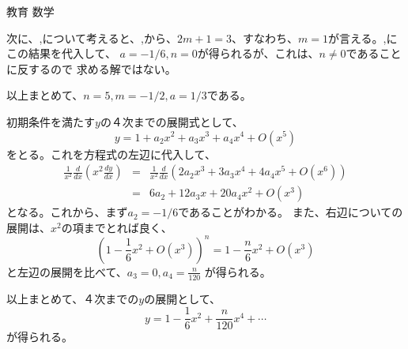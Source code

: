 \documentclass[fleqn]{jbook}
\begin{document}
\begin{answer}{教育 数学}{}
\begin{subanswers}
\begin{subsubanswers}
次に、,について考えると、,から、$2m+1=3$、すなわち、$m=1$が言える。,にこの結果を代入して、
$a=-1/6,n=0$が得られるが、これは、$n\neq0$であることに反するので
求める解ではない。

以上まとめて、$n=5,m=-1/2,a=1/3$である。

\SubSubAnswer
 初期条件を満たす$y$の４次までの展開式として、
\[y=1+a_2x^2+a_3x^3+a_4x^4+O(x^5) \]
をとる。これを方程式の左辺に代入して、
\begin{eqnarray*}
\frac{1}{x^2}\frac{d}{dx}\left(x^2\frac{dy}{dx}\right)
	&=&\frac{1}{x^2}\frac{d}{dx}\left(2a_2x^3+3a_3x^4+4a_4x^5+O(x^6)\right)\\
	&=&6a_2+12a_3x+20a_4x^2+O(x^3)
\end{eqnarray*}
となる。これから、まず$a_2=-1/6$であることがわかる。
また、右辺についての展開は、$x^2$の項までとれば良く、
\[\left(1-\frac{1}{6}x^2+O(x^3)\right)^n=1-\frac{n}{6}x^2+O(x^3)\]
と左辺の展開を比べて、$a_3=0,a_4=\displaystyle{\frac{n}{120}}$
が得られる。

以上まとめて、４次までの$y$の展開として、
\[y=1-\frac{1}{6}x^2+\frac{n}{120}x^4+\cdots\]
が得られる。
\end{subsubanswers}

\SubAnswer


\end{subanswers}
\end{answer}
\end{document}
